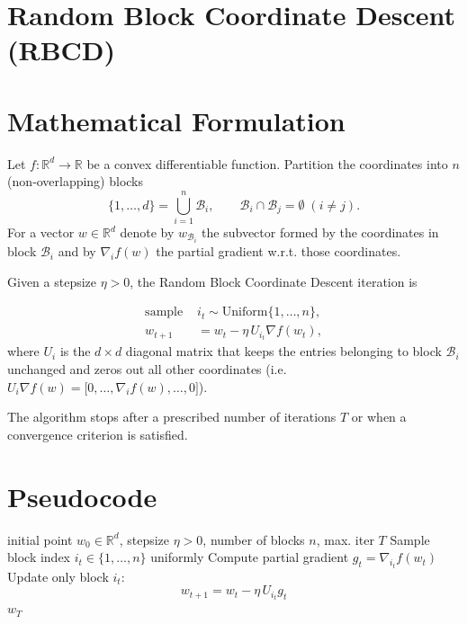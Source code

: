 \documentclass[11pt]{article}
\newcommand{\R}{\mathbb{R}}
\begin{document}
\section*{Random Block Coordinate Descent (RBCD)}

\section*{Mathematical Formulation}
Let $f:\R^{d}\rightarrow\R$ be a convex differentiable function.  
Partition the coordinates into $n$ (non‑overlapping) blocks
\[
\{1,\dots ,d\}= \bigcup_{i=1}^{n} \mathcal{B}_{i},\qquad 
\mathcal{B}_{i}\cap\mathcal{B}_{j}=\emptyset\;(i\neq j).
\]
For a vector $w\in\R^{d}$ denote by $w_{\mathcal{B}_{i}}$ the subvector formed by the
coordinates in block $\mathcal{B}_{i}$ and by $\nabla_{i}f(w)$ the partial
gradient w.r.t. those coordinates.

Given a stepsize $\eta>0$, the Random Block Coordinate Descent iteration is

\[
\boxed{
\begin{aligned}
\text{sample }& i_{t}\sim \text{Uniform}\{1,\dots ,n\},\\
w_{t+1}&= w_{t} - \eta\,U_{i_{t}}\nabla f(w_{t}),
\end{aligned}}
\tag{1}
\]
where $U_{i}$ is the $d\times d$ diagonal matrix that keeps the entries
belonging to block $\mathcal{B}_{i}$ unchanged and zeros out all other
coordinates (i.e. $U_{i}\nabla f(w)=\bigl[0,\dots ,\nabla_{i}f(w),\dots ,0\bigr]$).

The algorithm stops after a prescribed number of iterations $T$ or when a
convergence criterion is satisfied.

\section*{Pseudocode}
\begin{algorithm}[H]
\caption{Random Block Coordinate Descent}
\begin{algorithmic}[1]
\REQUIRE initial point $w_{0}\in\R^{d}$, stepsize $\eta>0$, number of blocks $n$, max. iter $T$
    \STATE Sample block index $i_{t}\in\{1,\dots ,n\}$ uniformly
    \STATE Compute partial gradient $g_{t}= \nabla_{i_{t}} f(w_{t})$
    \STATE Update only block $i_{t}$:
    \[
        w_{t+1}= w_{t} - \eta\,U_{i_{t}} g_{t}
    \]
\ENDFOR
\RETURN $w_{T}$
\end{algorithmic}
\end{algorithm}
\end{document}
